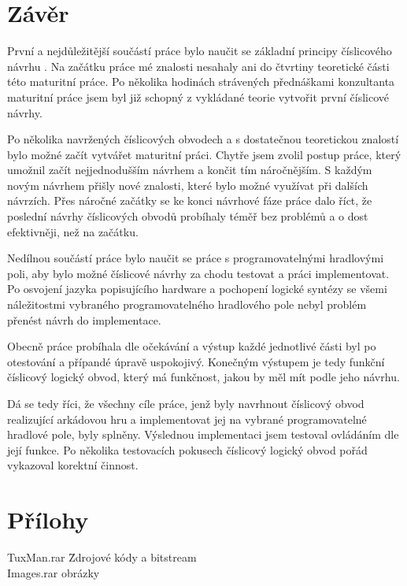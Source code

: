 \documentclass{report}
\begin{document}
 \chapter*{Závěr}
První a nejdůležitější součástí práce bylo naučit se základní principy číslicového návrhu . Na začátku práce mé znalosti nesahaly ani do čtvrtiny teoretické části této maturitní práce. Po několika hodinách strávených přednáškami konzultanta maturitní práce jsem byl již schopný z vykládané teorie vytvořit první číslicové návrhy. \par
Po několika navržených číslicových obvodech a s dostatečnou teoretickou znalostí bylo možné začít vytvářet maturitní práci. Chytře jsem zvolil postup práce, který umožnil začít nejjednodušším návrhem a končit tím náročnějším. S každým novým návrhem přišly nové znalosti, které bylo možné využívat při dalších návrzích. Přes náročné začátky se ke konci návrhové fáze práce dalo říct, že poslední návrhy číslicových obvodů probíhaly téměř bez problémů a o dost efektivněji, než na začátku. \par
 Nedílnou součástí práce bylo naučit se práce s programovatelnými hradlovými poli, aby bylo možné číslicové návrhy za chodu testovat a práci implementovat. Po osvojení jazyka popisujícího hardware a pochopení logické syntézy se všemi náležitostmi vybraného programovatelného hradlového pole nebyl problém přenést návrh do implementace. \par
Obecně práce probíhala dle očekávání a výstup každé jednotlivé části byl po otestování a přípandé úpravě uspokojivý. Konečným výstupem je tedy funkční číslicový logický obvod, který má funkčnost, jakou by měl mít podle jeho návrhu.  \par
Dá se tedy říci, že všechny cíle práce, jenž byly navrhnout číslicový obvod realizující arkádovou hru a implementovat jej na vybrané programovatelné hradlové pole,  byly splněny. Výslednou implementaci jsem testoval ovládáním dle její funkce. Po několika testovacích pokusech číslicový logický obvod pořád vykazoval korektní činnost.




\chapter*{Přílohy}
\begin{tabbing}
    TuxMan.rar \hspace{5em} \= Zdrojové kódy a bitstream  \\
    Images.rar \>  obrázky \\
\end{tabbing}
\end{document}
